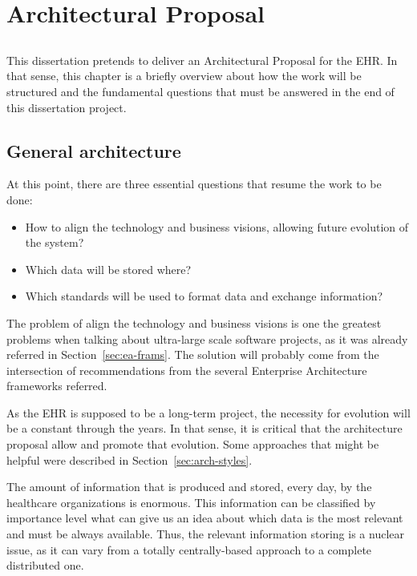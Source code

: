 \chapter{Architectural Proposal} \label{chap:arch-proposal}

\section*{}

This dissertation pretends to deliver an Architectural Proposal for the EHR. In that sense, this chapter is a briefly overview about how the work will be structured and the fundamental questions that must be answered in the end of this dissertation project.

\section{General architecture}

At this point, there are three essential questions that resume the work to be done:
\begin{itemize}
\item How to align the technology and business visions, allowing future evolution of the system?
\item Which data will be stored where?
\item Which standards will be used to format data and exchange information?
\end{itemize}

The problem of align the technology and business visions is one the greatest problems when talking about ultra-large scale software projects, as it was already referred in Section~\ref{sec:ea-frams}. The solution will probably come from the intersection of recommendations from the several Enterprise Architecture frameworks referred.

As the EHR is supposed to be a long-term project, the necessity for evolution will be a constant through the years. In that sense, it is critical that the architecture proposal allow and promote that evolution. Some approaches that might be helpful were described in Section~\ref{sec:arch-styles}.

The amount of information that is produced and stored, every day, by the healthcare organizations is enormous. This information can be classified by importance level what can give us an idea about which data is the most relevant and must be always available. Thus, the relevant information storing is a nuclear issue, as it can vary from a totally centrally-based approach to a complete distributed one.

